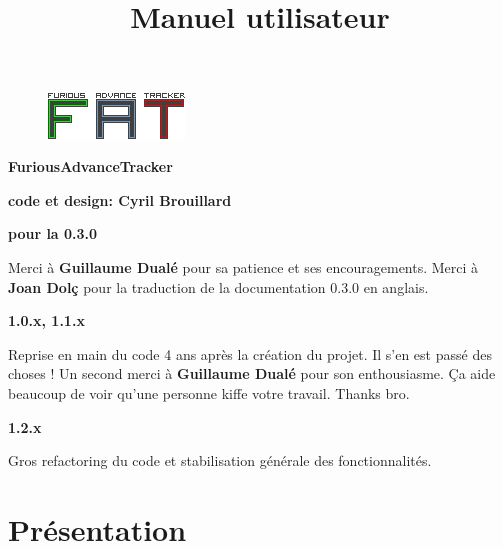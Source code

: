 \documentclass[12pt,a4paper]{article}
\title{\bf \SimpleImage{images/furicat_color}{0.3} \\ Manuel utilisateur}
\author{\fatversion}
\begin{document}
  \begin{figure}
    \begin{center}
    \includegraphics[scale=2]{images/logo}
    \end{center}
  \end{figure}
  \maketitle{}
  \thispagestyle{empty}
  \setcounter{page}{0}
  \ClearShipoutPicture

  \newpage

  \begin{center}

  {\bf \FAT FuriousAdvanceTracker} \medskip

  {\bf code et design: Cyril Brouillard} \medskip

  \end{center}

  {\bf pour la 0.3.0} \medskip

  Merci à {\bf \textcolor{vert}{Guillaume Dualé}} pour sa patience et ses encouragements.
  Merci à {\bf \textcolor{vert}{Joan Dolç}} pour la traduction de la documentation 0.3.0 en anglais. \medskip

  {\bf 1.0.x, 1.1.x} \medskip

  Reprise en main du code 4 ans après la création du projet. Il s'en est passé des choses !
  Un second merci à {\bf \textcolor{vert}{Guillaume Dualé}} pour son enthousiasme. Ça aide beaucoup de voir qu'une personne kiffe votre travail. Thanks bro. \medskip

  {\bf 1.2.x} \medskip

  Gros refactoring du code et stabilisation générale des fonctionnalités.

  \thispagestyle{empty}
  \setcounter{page}{0}
  \ClearShipoutPicture
  \newpage

  \tableofcontents{}
  \newpage

  \section{Présentation}
  
\end{document}
